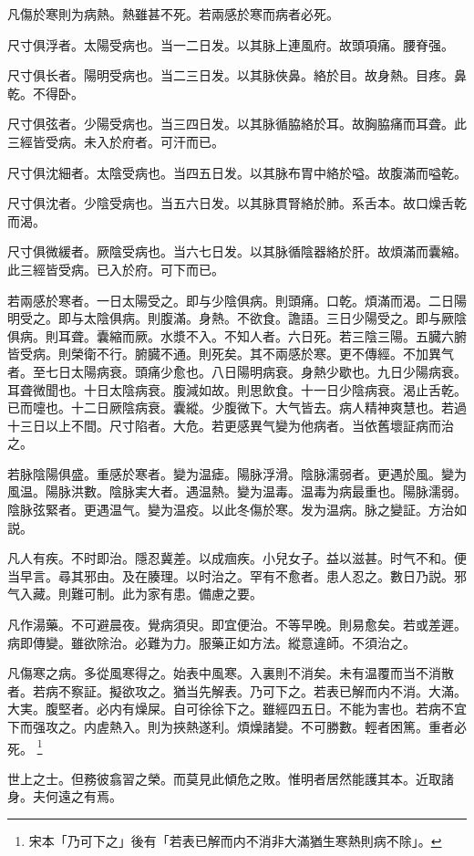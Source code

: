凡傷於寒則为病熱。熱雖甚不死。若兩感於寒而病者必死。

尺寸俱浮者。太陽受病也。当一二日发。以其脉上連風府。故頭項痛。腰脊强。

尺寸俱长者。陽明受病也。当二三日发。以其脉俠鼻。絡於目。故身熱。目疼。鼻乾。不得卧。

尺寸俱弦者。少陽受病也。当三四日发。以其脉循脇絡於耳。故胸脇痛而耳聋。此三經皆受病。未入於府者。可汗而已。

尺寸俱沈細者。太陰受病也。当四五日发。以其脉布胃中絡於嗌。故腹滿而嗌乾。

尺寸俱沈者。少陰受病也。当五六日发。以其脉貫腎絡於肺。系舌本。故口燥舌乾而渴。

尺寸俱微緩者。厥陰受病也。当六七日发。以其脉循陰器絡於肝。故煩滿而囊縮。此三經皆受病。已入於府。可下而已。

若兩感於寒者。一日太陽受之。即与少陰俱病。則頭痛。口乾。煩滿而渴。二日陽明受之。即与太陰俱病。則腹滿。身熱。不欲食。譫語。三日少陽受之。即与厥陰俱病。則耳聋。囊縮而厥。水漿不入。不知人者。六日死。若三陰三陽。五臓六腑皆受病。則榮衛不行。腑臓不通。則死矣。其不兩感於寒。更不傳經。不加異气者。至七日太陽病衰。頭痛少愈也。八日陽明病衰。身熱少歇也。九日少陽病衰。耳聋微聞也。十日太陰病衰。腹減如故。則思飲食。十一日少陰病衰。渴止舌乾。已而嚏也。十二日厥陰病衰。囊縱。少腹微下。大气皆去。病人精神爽慧也。若過十三日以上不間。尺寸陷者。大危。若更感異气變为他病者。当依舊壞証病而治之。

若脉陰陽俱盛。重感於寒者。變为温瘧。陽脉浮滑。陰脉濡弱者。更遇於風。變为風温。陽脉洪數。陰脉実大者。遇温熱。變为温毒。温毒为病最重也。陽脉濡弱。陰脉弦緊者。更遇温气。變为温疫。以此冬傷於寒。发为温病。脉之變証。方治如説。

凡人有疾。不时即治。隱忍冀差。以成痼疾。小兒女子。益以滋甚。时气不和。便当早言。尋其邪由。及在腠理。以时治之。罕有不愈者。患人忍之。數日乃説。邪气入藏。則難可制。此为家有患。備慮之要。

凡作湯藥。不可避晨夜。覺病須臾。即宜便治。不等早晚。則易愈矣。若或差遲。病即傳變。雖欲除治。必難为力。服藥正如方法。縱意違師。不須治之。

凡傷寒之病。多從風寒得之。始表中風寒。入裏則不消矣。未有温覆而当不消散者。若病不察証。擬欲攻之。猶当先解表。乃可下之。若表已解而内不消。大滿。大実。腹堅者。必内有燥屎。自可徐徐下之。雖經四五日。不能为害也。若病不宜下而强攻之。内虗熱入。{\khaaitp 則为}挾熱遂利。煩燥諸變。不可勝數。輕者困篤。重者必死。
	\footnote{宋本「乃可下之」後有「若表已解而内不消非大滿猶生寒熱則病不除」。}

世上之士。但務彼翕習之榮。而莫見此傾危之敗。惟明者居然能護其本。近取諸身。夫何遠之有焉。

